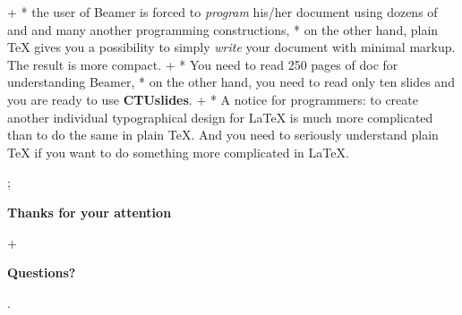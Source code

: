 \pg+
* the user of Beamer is forced to {\em program} his/her document using 
  dozens of \code{\\begin{foo}} and \code{\\end{foo}} and many another
  programming constructions,
* on the other hand, plain \TeX{} gives you a possibility to simply 
  {\em write} your document with minimal markup. The result is more compact.
\pg+
* You need to read 250 pages of doc for understanding Beamer,
* on the other hand, you need to read only ten 
  slides
  and you are ready to use {\bf\Blue CTUslides}.
\pg+
* A notice for programmers: to create another individual typographical 
  design for \LaTeX{} is much more complicated than to do the same
  in plain \TeX. And you need to seriously understand plain \TeX{} if you
  want to do something more complicated in \LaTeX.

\pg; %

\null
\vskip2cm
\centerline{\typosize[35/40]\bf Thanks for your attention}\pg+

\vskip2cm
\centerline{\Blue\typosize[60/70]\bf Questions?}

\pg. %

